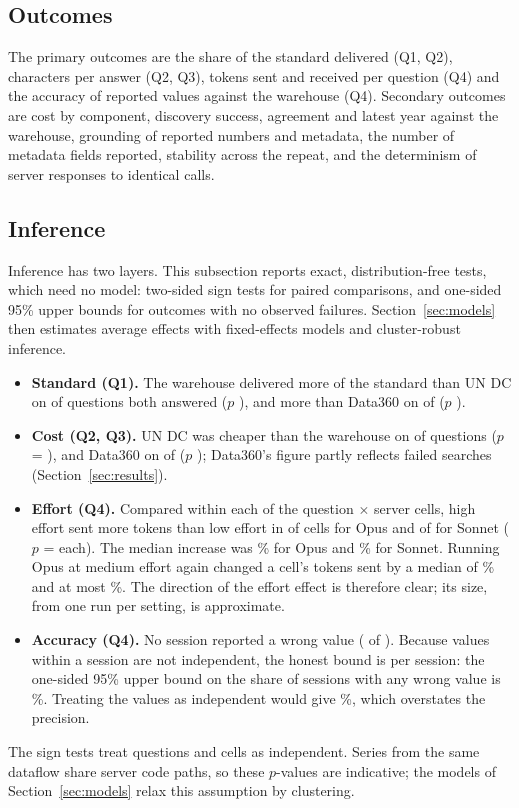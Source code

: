 \documentclass[11pt,a4paper]{article}
\begin{document}
\subsection{Outcomes}
The primary outcomes are the share of the standard delivered (Q1, Q2), characters per answer (Q2, Q3), tokens sent and received per question (Q4) and the accuracy of reported values against the warehouse (Q4). Secondary outcomes are cost by component, discovery success, agreement and latest year against the warehouse, grounding of reported numbers and metadata, the number of metadata fields reported, stability across the repeat, and the determinism of server responses to identical calls.

\subsection{Inference}
Inference has two layers. This subsection reports exact, distribution-free tests, which need no model: two-sided sign tests for paired comparisons, and one-sided 95\% upper bounds for outcomes with no observed failures. Section~\ref{sec:models} then estimates average effects with fixed-effects models and cluster-robust inference.
\begin{itemize}
\item \textbf{Standard (Q1).} The warehouse delivered more of the standard than UN DC on \tShareUnK{} of \tShareUnN{} questions both answered ($p$ \tShareUnP), and more than Data360 on \tShareDK{} of \tShareDN{} ($p$ \tShareDP).
\item \textbf{Cost (Q2, Q3).} UN DC was cheaper than the warehouse on \tCostUnK{} of \tCostUnN{} questions ($p$ = \tCostUnP), and Data360 on \tCostDK{} of \tCostDN{} ($p$ \tCostDP); Data360's figure partly reflects failed searches (Section~\ref{sec:results}).
\item \textbf{Effort (Q4).} Compared within each of the \effN{} question $\times$ server cells, high effort sent more tokens than low effort in \effOpusK{} of \effN{} cells for Opus and \effSonnetK{} of \effN{} for Sonnet ($p$ = \effP{} each). The median increase was \effOpusPct\% for Opus and \effSonnetPct\% for Sonnet. Running Opus at medium effort again changed a cell's tokens sent by a median of \repCellMed\% and at most \repCellMax\%. The direction of the effort effect is therefore clear; its size, from one run per setting, is approximate.
\item \textbf{Accuracy (Q4).} No session reported a wrong value (\wrongSessions{} of \sessions{}). Because values within a session are not independent, the honest bound is per session: the one-sided 95\% upper bound on the share of sessions with any wrong value is \errBoundSess\%. Treating the  values as independent would give \errBoundVal\%, which overstates the precision.
\end{itemize}
The sign tests treat questions and cells as independent. Series from the same dataflow share server code paths, so these $p$-values are indicative; the models of Section~\ref{sec:models} relax this assumption by clustering.
\end{document}
